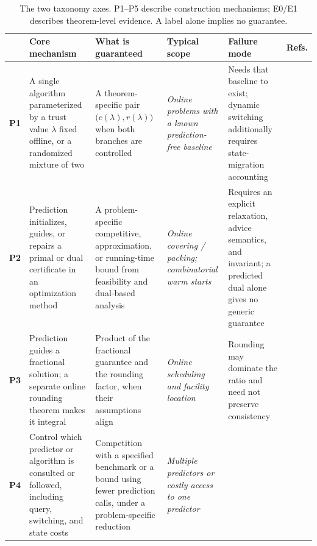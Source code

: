 \documentclass[acmsmall,screen,nonacm]{acmart}
\theoremstyle{acmdefinition}%
\begin{document}
\begin{table}[t!]
\centering
\setlength{\tabcolsep}{3pt}
\caption{The two taxonomy axes. P1--P5 describe construction mechanisms; E0/E1 describes theorem-level evidence. A label alone implies no guarantee.}
\label{tab:paradigm_summary}
\footnotesize
\begin{tabular}{@{}
    >{\centering\arraybackslash}p{0.57cm}
    >{\raggedright\arraybackslash}p{2.69cm}
    >{\raggedright\arraybackslash}p{3.08cm}
    >{\raggedright\arraybackslash}p{1.84cm}
    >{\raggedright\arraybackslash}p{3.08cm}
    >{\raggedright\arraybackslash}p{1.23cm}
@{}}
\toprule
& \textbf{Core mechanism} & \textbf{What is guaranteed} & \textbf{Typical scope} & \textbf{Failure mode} & \textbf{Refs.} \\
\midrule
\textbf{P1}
& A single algorithm parameterized by a trust value $\lambda$ fixed offline, or a randomized mixture of two
& A theorem-specific pair $\big(c(\lambda), r(\lambda)\big)$ when both branches are controlled
& \textit{Online problems with a known prediction-free baseline}
& Needs that baseline to exist; dynamic switching additionally requires state-migration accounting
& \cite{purohit2018improving,gollapudi2019rentorbuy,wei2020optimal,grigorescu2025packing} \\
\addlinespace[3pt]
\textbf{P2}
& Prediction initializes, guides, or repairs a primal or dual certificate in an optimization method
& A problem-specific competitive, approximation, or running-time bound from feasibility and dual-based analysis
& \textit{Online covering / packing; combinatorial warm starts}
& Requires an explicit relaxation, advice semantics, and invariant; a predicted dual alone gives no generic guarantee
& \cite{bamas2020primal,bamas2020energy,dinitz2021duals,sakaue2022dca,grigorescu2025packing} \\
\addlinespace[3pt]
\textbf{P3}
& Prediction guides a fractional solution; a separate online rounding theorem makes it integral
& Product of the fractional guarantee and the rounding factor, when their assumptions align
& \textit{Online scheduling and facility location}
& Rounding may dominate the ratio and need not preserve consistency
& \cite{lattanzi2020online,lattanzi2026facility} \\
\addlinespace[3pt]
\textbf{P4}
& Control which predictor or algorithm is consulted or followed, including query, switching, and state costs
& Competition with a specified benchmark or a bound using fewer prediction calls, under a problem-specific reduction
& \textit{Multiple predictors or costly access to one predictor}

\end{tabular}
\end{table}
\end{document}

